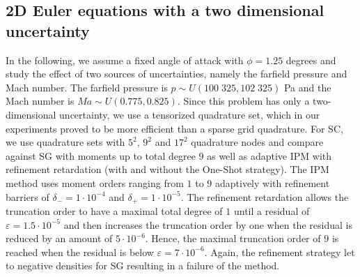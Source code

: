 \subsection{2D Euler equations with a two dimensional uncertainty}

In the following, we assume a fixed angle of attack with $\phi = 1.25$ degrees and study the effect of two sources of uncertainties, namely the farfield pressure and Mach number. The farfield pressure is ${p \sim U(100\;325,102\;325)}$ Pa and the Mach number is $Ma \sim U(0.775,0.825)$. Since this problem has only a two-dimensional uncertainty, we use a tensorized quadrature set, which in our experiments proved to be more efficient than a sparse grid quadrature. For SC, we use quadrature sets with $5^2$, $9^2$ and $17^2$ quadrature nodes and compare against SG with moments up to total degree $9$ as well as adaptive IPM with refinement retardation (with and without the One-Shot strategy). The IPM method uses moment orders ranging from $1$ to $9$ adaptively with refinement barriers of $\delta_{-} = 1\cdot 10^{-4}$ and $\delta_{+} = 1\cdot 10^{-5}$. The refinement retardation allows the truncation order to have a maximal total degree of $1$ until a residual of $\varepsilon = 1.5\cdot 10^{-5}$ and then increases the truncation order by one when the residual is reduced by an amount of $5\cdot 10^{-6}$. Hence, the maximal truncation order of $9$ is reached when the residual is below $\varepsilon = 7\cdot 10^{-6}$. Again, the refinement strategy let to negative densities for SG resulting in a failure of the method.
